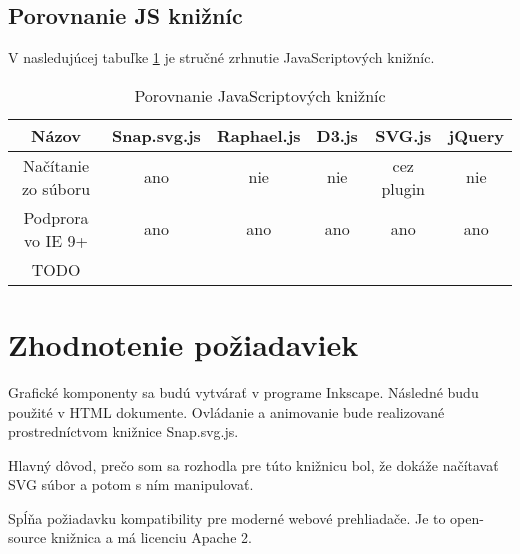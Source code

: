 \subsection{Porovnanie JS knižníc}
V nasledujúcej tabuľke \ref{jsKniznice} je stručné zrhnutie JavaScriptových knižníc.

 \begin{table}[H]
 \centering
 \begin{tabular}{|c|c|c|c|c|c|}
	\hline Názov & Snap.svg.js & Raphael.js & D3.js & SVG.js & jQuery \\ 
	\hline Načítanie zo súboru & ano & nie  & nie & cez plugin & nie \\ 
	\hline Podprora vo IE 9+ & ano & ano  & ano & ano  & ano \\ 
	\hline TODO &  &  &  &  &  \\ 
	\hline 
\end{tabular} 
 \caption{Porovnanie JavaScriptových knižníc}
 \label{jsKniznice}
 
\end{table}




\section{Zhodnotenie požiadaviek}
Grafické komponenty sa budú vytvárať v programe Inkscape. Následné budu použité v HTML dokumente. Ovládanie a animovanie bude realizované prostredníctvom knižnice Snap.svg.js. 

Hlavný dôvod, prečo som sa rozhodla pre túto  knižnicu bol, že dokáže načítavať SVG súbor a potom s ním manipulovať.
 
Spĺňa požiadavku kompatibility pre moderné webové prehliadače. Je to open-source knižnica a má licenciu Apache 2.